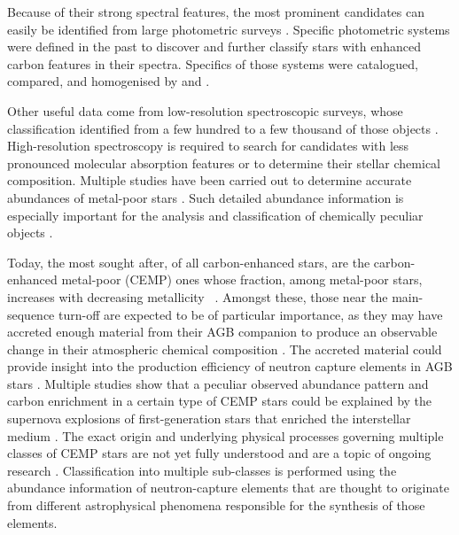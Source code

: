 Because of their strong spectral features, the most prominent candidates can easily be identified from large photometric surveys \cite{2002AJ....124.1651M, 2004AJ....127.2838D}. Specific photometric systems \cite{1960MNRAS.120..287G, 1968AJ.....73..313M, 1970A&AS....1..199H} were defined in the past to discover and further classify stars with enhanced carbon features in their spectra. Specifics of those systems were catalogued, compared, and homogenised by \citet{2000A&AS..147..361M} and \citet{2003A&A...401..781F}.

Other useful data come from low-resolution spectroscopic surveys, whose classification identified from a few hundred to a few thousand of those objects \cite{2001A&A...375..366C, 2013ApJ...765...12G, 2013AJ....146..132L, 2016ApJS..226....1J, 2018ApJS..234...31L}. High-resolution spectroscopy is required to search for candidates with less pronounced molecular absorption features or to determine their stellar chemical composition. Multiple studies have been carried out to determine accurate abundances of metal-poor stars \cite{1997ApJ...488..350N, 2002ApJ...567.1166A, 2004A&A...416.1117C, 2005ESASP.560..433B, 2006AJ....132..137C, 2007ApJ...655..492A, 2007ApJ...670..774N, 2011ApJ...742...54H, 2013ApJ...762...26Y, 2014AJ....147..136R, 2015ApJ...807..173H, 2015ApJ...807..171J}. Such detailed abundance information is especially important for the analysis and classification of chemically peculiar objects \cite{2013ApJ...778...56C}.

Today, the most sought after, of all carbon-enhanced stars, are the carbon-enhanced metal-poor (CEMP) ones whose fraction, among metal-poor stars, increases with decreasing metallicity \Meh\ \cite{1992AJ....103.1987B, 1997ApJ...488..350N, 1999ASPC..165..264R, 2005ApJ...633L.109C, 2005ApJ...625..825L, 2005AJ....130.2804R, 2006ApJ...652.1585F, 2007PhDT........22M, 2012ApJ...744..195C, 2013AJ....146..132L, 2013ApJ...762...27Y,  2014ApJ...797...21P, 2018ApJ...861..146Y}. Amongst these, those near the main-sequence turn-off are expected to be of particular importance, as they may have accreted enough material from their AGB companion to produce an observable change in their atmospheric chemical composition \cite{2004ApJ...611..476S, 2014MNRAS.441.1217S, 2015ApJ...807..173H}. The accreted material could provide insight into the production efficiency of neutron capture elements in AGB stars \cite{2007ApJ...655..492A}. Multiple studies show that a peculiar observed abundance pattern and carbon enrichment in a certain type of CEMP stars could be explained by the supernova explosions of first-generation stars that enriched the interstellar medium \cite{2003Natur.422..871U, 2005ApJ...619..427U, 2014ApJ...785...98T, 2018MNRAS.tmp.2127B}. The exact origin and underlying physical processes governing multiple classes of CEMP stars are not yet fully understood and are a topic of ongoing research \cite{2014ApJ...788..180C, 2016ApJ...833...20Y, 2018MNRAS.475.4781C}. Classification into multiple sub-classes is performed using the abundance information of neutron-capture elements \cite{2005ARA&A..43..531B, 2013A&A...552A.107S, 2015ApJ...814..121H, 2016ApJ...833...20Y} that are thought to originate from different astrophysical phenomena responsible for the synthesis of those elements.

